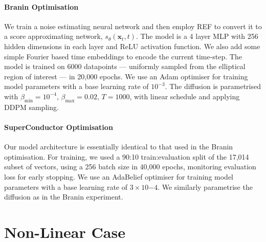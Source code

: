 \paragraph{Branin Optimisation} We train a noise estimating neural network and then employ
REF to convert it to a score approximating network, $s_\theta(\mathbf{x}_t, t)$.
The model is a 4 layer MLP with 256 hidden dimensions in each layer and ReLU activation function.
We also add some simple Fourier based time embeddings to encode the current time-step. The model
is trained on 6000 datapoints --- uniformly sampled from the elliptical region of interest --- in
20,000 epochs. We use an Adam optimiser for training model parameters with a base learning rate of
$10^{-3}$. The diffusion is parametrised with $\beta_{\text{min}}=10^{-4}$,
$\beta_{\text{max}}=0.02$, $T=1000$, with linear schedule and applying DDPM sampling.

\paragraph{SuperConductor Optimisation} Our model architecture is essentially identical to that used
in the Branin optimisation. For training, we used a 90:10 train:evaluation split of the 17,014
subset of vectors, using a 256 batch size in 40,000 epochs, monitoring evaluation loss for early
stopping. We use an AdaBelief optimiser for training model parameters with a base learning rate of
$3\times 10{-4}$. We similarly parametrise the diffusion as in the Branin experiment.

\newpage

\section{Non-Linear Case} \label{sec:non-linear}

